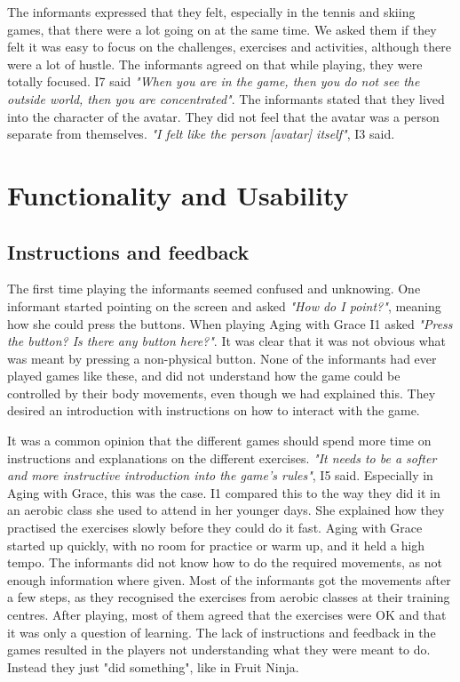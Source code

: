 The informants expressed that they felt, especially in the tennis and skiing games, that there were a lot going on at the same time. We asked them if they felt it was easy to focus on the challenges, exercises and activities, although there were a lot of hustle. The informants agreed on that while playing, they were totally focused. I7 said \emph{"When you are in the game, then you do not see the outside world, then you are concentrated"}. The informants stated that they lived into the character of the avatar. They did not feel that the avatar was a person separate from themselves. \emph{"I felt like the person [avatar] itself"}, I3 said. 

\section{Functionality and Usability}
\subsection{Instructions and feedback}
The first time playing the informants seemed confused and unknowing. One informant started pointing on the screen and asked \emph{"How do I point?"}, meaning how she could press the buttons. When playing Aging with Grace I1 asked \emph{"Press the button? Is there any button here?"}. It was clear that it was not obvious what was meant by pressing a non-physical button. None of the informants had ever played games like these, and did not understand how the game could be controlled by their body movements, even though we had explained this. They desired an introduction with instructions on how to interact with the game.

It was a common opinion that the different games should spend more time on instructions and explanations on the different exercises. \emph{"It needs to be a softer and more instructive introduction into the game's rules"}, I5 said. Especially in Aging with Grace, this was the case. I1 compared this to the way they did it in an aerobic class she used to attend in her younger days. She explained how they practised the exercises slowly before they could do it fast. Aging with Grace started up quickly, with no room for practice or warm up, and it held a high tempo. The informants did not know how to do the required movements, as not enough information where given. Most of the informants got the movements after a few steps, as they recognised the exercises from aerobic classes at their training centres. After playing, most of them agreed that the exercises were OK and that it was only a question of learning. The lack of instructions and feedback in the games resulted in the players not understanding what they were meant to do. Instead they just "did something", like in Fruit Ninja. 

